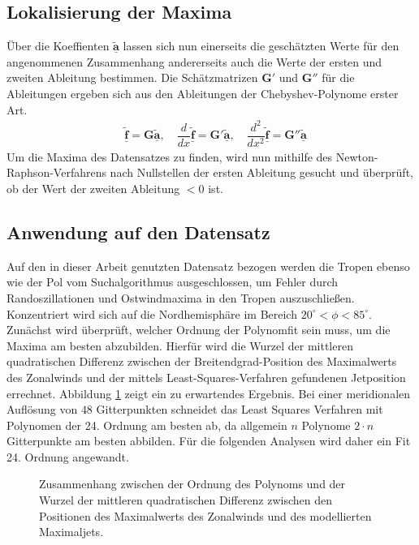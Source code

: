 \subsection{Lokalisierung der Maxima}
Über die Koeffienten $\underline{\boldsymbol{\tilde{a}}}$ lassen sich nun einerseits die geschätzten Werte für den angenommenen Zusammenhang andererseits auch die Werte der ersten und zweiten Ableitung bestimmen. Die Schätzmatrizen $\boldsymbol{G}'$ und $\boldsymbol{G}''$ für die Ableitungen ergeben sich aus den Ableitungen der Chebyshev-Polynome erster Art.
\begin{align}
& \underline{\boldsymbol{\tilde{f}}} = \boldsymbol{G}\underline{\boldsymbol{\tilde{a}}}, \hspace{1em} \dfrac{d}{dx}\underline{\boldsymbol{\tilde{f}}} = \boldsymbol{G}'\underline{\boldsymbol{\tilde{a}}}, \hspace{1em} \dfrac{d^2}{dx^2}\underline{\boldsymbol{\tilde{f}}} = \boldsymbol{G}''\underline{\boldsymbol{\tilde{a}}}
\end{align}
Um die Maxima des Datensatzes zu finden, wird nun mithilfe des Newton-Raphson-Verfahrens nach Nullstellen der ersten Ableitung gesucht und überprüft, ob der Wert der zweiten Ableitung $<0$ ist.


\subsection{Anwendung auf den Datensatz}
Auf den in dieser Arbeit genutzten Datensatz bezogen werden die Tropen ebenso wie der Pol vom Suchalgorithmus ausgeschlossen, um Fehler durch Randoszillationen und Ostwindmaxima in den Tropen auszuschließen. Konzentriert wird sich auf die Nordhemisphäre im Bereich $20^{\circ} < \phi < 85^{\circ}$. Zunächst wird überprüft, welcher Ordnung der Polynomfit sein muss, um die Maxima am besten abzubilden. Hierfür wird die Wurzel der mittleren quadratischen Differenz zwischen der Breitendgrad-Position des Maximalwerts des Zonalwinds und der mittels Least-Squares-Verfahren gefundenen Jetposition errechnet. Abbildung \ref{fig:order_rmse} zeigt ein zu erwartendes Ergebnis. Bei einer meridionalen Auflösung von $48$ Gitterpunkten schneidet das Least Squares Verfahren mit Polynomen der 24. Ordnung am besten ab, da allgemein $n$ Polynome $2 \cdot n$ Gitterpunkte am besten abbilden. Für die folgenden Analysen wird daher ein Fit 24. Ordnung angewandt. 

\begin{figure}
  \centering
  \caption{Zusammenhang zwischen der Ordnung des Polynoms und der Wurzel der mittleren quadratischen Differenz zwischen den Positionen des Maximalwerts des Zonalwinds und des modellierten Maximaljets.} \label{fig:order_rmse}
\end{figure}

